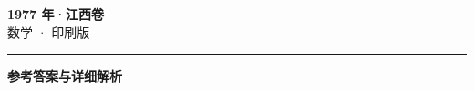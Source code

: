 \documentclass[zihao=5, a4paper]{ctexart}
\begin{document}
\begin{center}
  {\Large\bfseries 1977 年·江西卷}\\[4pt]
  {\large 数学 · 印刷版}
\end{center}
\medskip
{}

\par\bigskip\hrule\bigskip
{}
\begin{center}{\large\bfseries 参考答案与详细解析}\end{center}
\smallskip

\end{document}
